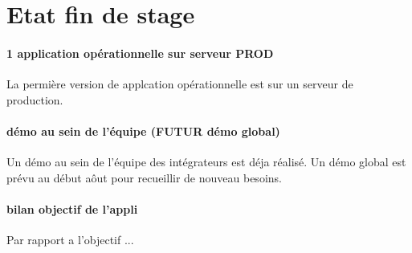 \section{Etat fin de stage}
\paragraph{1 application opérationnelle sur serveur PROD}
La permière version de applcation opérationnelle est sur un serveur de production.
\paragraph{démo au sein de l’équipe (FUTUR démo global)}
Un démo au sein de l'équipe des intégrateurs est déja réalisé. Un démo global est prévu au début aôut pour recueillir de nouveau besoins.
\paragraph{bilan objectif de l’appli}
Par rapport a l'objectif ...

\clearpage
